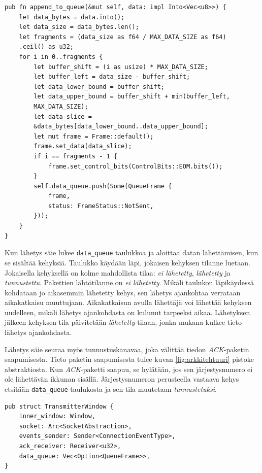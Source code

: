 \documentclass[a4paper,12pt]{article}
\begin{document}
    \begin{lstlisting}[caption={Datan käsittely lähettämistä varten}, label={lst:append_to_queue}]
pub fn append_to_queue(&mut self, data: impl Into<Vec<u8>>) {
    let data_bytes = data.into();
    let data_size = data_bytes.len();
    let fragments = (data_size as f64 / MAX_DATA_SIZE as f64)
    .ceil() as u32;
    for i in 0..fragments {
        let buffer_shift = (i as usize) * MAX_DATA_SIZE;
        let buffer_left = data_size - buffer_shift;
        let data_lower_bound = buffer_shift;
        let data_upper_bound = buffer_shift + min(buffer_left,
        MAX_DATA_SIZE);
        let data_slice =
        &data_bytes[data_lower_bound..data_upper_bound];
        let mut frame = Frame::default();
        frame.set_data(data_slice);
        if i == fragments - 1 {
            frame.set_control_bits(ControlBits::EOM.bits());
        }
        self.data_queue.push(Some(QueueFrame {
            frame,
            status: FrameStatus::NotSent,
        }));
    }
}
\end{lstlisting}
 
Kun lähetys säie lukee \lstinline{data_queue} taulukkoa ja aloittaa datan lähettämisen, kun se sisältää kehyksiä. Taulukko käydään läpi, jokaisen kehyksen tilanne luetaan. Jokaisella kehyksellä on kolme mahdollista tilaa: \textit{ei lähetetty}, \textit{lähetetty} ja \textit{tunnustettu}. Pakettien lähtötilanne on \textit{ei lähetetty}. Mikäli taulukon läpikäydessä kohdataan jo aikasemmin lähetetty kehys, sen lähetys ajankohtaa verrataan aikakatkaisu muuttujaan. Aikakatkaisun avulla lähettäjä voi lähettää kehyksen uudelleen, mikäli lähetys ajankohdasta on kulunut tarpeeksi aikaa. Lähetyksen jälkeen kehyksen tila päivitetään \textit{lähetetty}-tilaan, jonka mukana kulkee tieto lähetys ajankohdasta. \par

Lähetys säie seuraa myös tunnustuskanavaa, joka välittää tiedon \textit{ACK}-paketin saapumisesta. Tieto paketin saapumisesta tulee kuvan \ref{fig:arkkitehtuuri} pistoke abstraktiosta. Kun \textit{ACK}-paketti saapuu, se hylätään, jos sen järjestysnumero ei ole lähettävän ikkunan sisällä. Järjestysnumeron perusteella vastaava kehys etsitään \lstinline{data_queue} taulukosta ja sen tila muutetaan \textit{tunnustetuksi}. \par
    
    \begin{lstlisting}[caption={Lähettävän ikkunan rakenne}, label={lst:twindow}]
pub struct TransmitterWindow {
    inner_window: Window,
    socket: Arc<SocketAbstraction>,
    events_sender: Sender<ConnectionEventType>,
    ack_receiver: Receiver<u32>,
    data_queue: Vec<Option<QueueFrame>>,
}\end{lstlisting}
\end{document}
